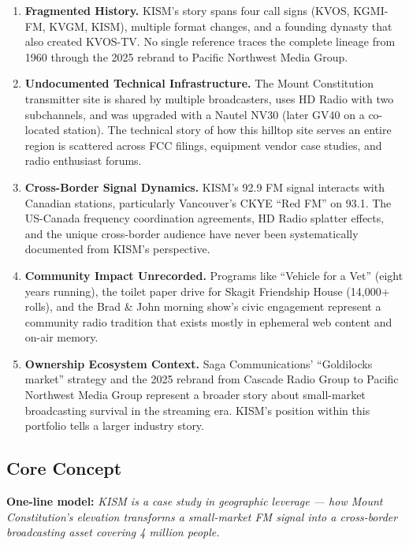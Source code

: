 \documentclass[11pt,letterpaper]{article}
\begin{document}
\begin{enumerate}[label=\textbf{\arabic*.}]
\item \textbf{Fragmented History.} KISM's story spans four call signs (KVOS, KGMI-FM, KVGM, KISM), multiple format changes, and a founding dynasty that also created KVOS-TV. No single reference traces the complete lineage from 1960 through the 2025 rebrand to Pacific Northwest Media Group.

\item \textbf{Undocumented Technical Infrastructure.} The Mount Constitution transmitter site is shared by multiple broadcasters, uses HD Radio with two subchannels, and was upgraded with a Nautel NV30 (later GV40 on a co-located station). The technical story of how this hilltop site serves an entire region is scattered across FCC filings, equipment vendor case studies, and radio enthusiast forums.

\item \textbf{Cross-Border Signal Dynamics.} KISM's 92.9 FM signal interacts with Canadian stations, particularly Vancouver's CKYE ``Red FM'' on 93.1. The US-Canada frequency coordination agreements, HD Radio splatter effects, and the unique cross-border audience have never been systematically documented from KISM's perspective.

\item \textbf{Community Impact Unrecorded.} Programs like ``Vehicle for a Vet'' (eight years running), the toilet paper drive for Skagit Friendship House (14,000+ rolls), and the Brad \& John morning show's civic engagement represent a community radio tradition that exists mostly in ephemeral web content and on-air memory.

\item \textbf{Ownership Ecosystem Context.} Saga Communications' ``Goldilocks market'' strategy and the 2025 rebrand from Cascade Radio Group to Pacific Northwest Media Group represent a broader story about small-market broadcasting survival in the streaming era. KISM's position within this portfolio tells a larger industry story.
\end{enumerate}

\subsection{Core Concept}

\begin{quotebox}
\textbf{One-line model:} \textit{KISM is a case study in geographic leverage --- how Mount Constitution's elevation transforms a small-market FM signal into a cross-border broadcasting asset covering 4 million people.}
\end{quotebox}
\end{document}
